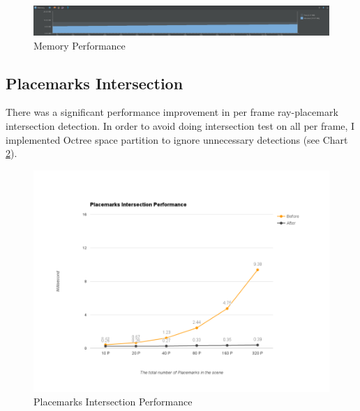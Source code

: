 \begin{figure}[H]
	\caption{Memory Performance}
	\label{fig:memory-performance}
	\centering
	\includegraphics[width=\textwidth, keepaspectratio]{Figures/memory-performance.png}
	\decoRule
\end{figure}

\subsection{Placemarks Intersection}
\label{section-placemarks-intersection}

There was a significant performance improvement in per frame ray-placemark intersection detection. In order to avoid doing intersection test on all  per frame, I implemented Octree space partition to ignore unnecessary detections (see Chart \ref{fig:placemarks-intersection-performance}).

\begin{figure}[H]
	\caption{Placemarks Intersection Performance}
	\label{fig:placemarks-intersection-performance}
	\centering
	\includegraphics[width=\textwidth, keepaspectratio]{Figures/placemarks-intersection-performance.png}
	\decoRule
\end{figure}

